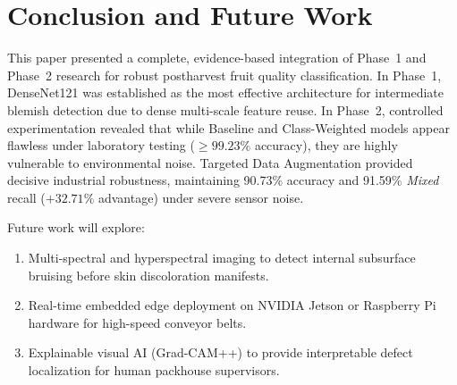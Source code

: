 \documentclass[conference]{IEEEtran}
\begin{document}
\section{Conclusion and Future Work}
This paper presented a complete, evidence-based integration of Phase~1 and Phase~2 research for robust postharvest fruit quality classification. In Phase~1, DenseNet121 was established as the most effective architecture for intermediate blemish detection due to dense multi-scale feature reuse. In Phase~2, controlled experimentation revealed that while Baseline and Class-Weighted models appear flawless under laboratory testing ($\ge 99.23\%$ accuracy), they are highly vulnerable to environmental noise. Targeted Data Augmentation provided decisive industrial robustness, maintaining 90.73\% accuracy and 91.59\% \textit{Mixed} recall ($+32.71\%$ advantage) under severe sensor noise.

Future work will explore:
\begin{enumerate}
    \item Multi-spectral and hyperspectral imaging to detect internal subsurface bruising before skin discoloration manifests.
    \item Real-time embedded edge deployment on NVIDIA Jetson or Raspberry Pi hardware for high-speed conveyor belts.
    \item Explainable visual AI (Grad-CAM++) to provide interpretable defect localization for human packhouse supervisors.
\end{enumerate}



\end{document}

